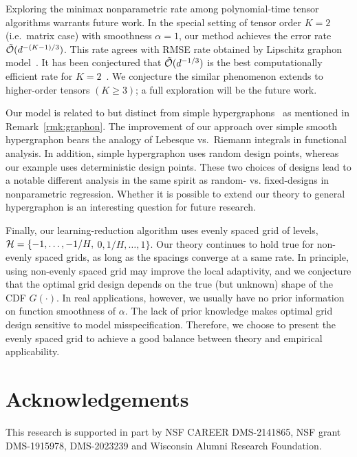 \documentclass[twoside,11pt]{article}
\theoremstyle{definition}
\begin{document}
Exploring the minimax nonparametric rate among polynomial-time tensor algorithms warrants future work. In the special setting of tensor order $K = 2$ (i.e.\ matrix case) with smoothness $\alpha=1$, our method achieves the error rate $\tilde{\mathcal{O}}(d^{-(K-1)/3})$. This rate agrees with RMSE rate obtained by Lipschitz graphon model~\citep{xu2018rates}. It has been conjectured that $\tilde {\mathcal{O}}(d^{-1/3})$ is the best computationally efficient rate for $K=2$~\citep{xu2018rates,zhang2018network}. We conjecture the similar phenomenon extends to higher-order tensors $(K\geq 3)$; a full exploration will be the future work. 

Our model is related to but distinct from simple hypergraphons~\citep{balasubramanian2021nonparametric} as mentioned in Remark~\ref{rmk:graphon}. 
The improvement of our approach over simple smooth hypergraphon bears the analogy of Lebesque vs.\ Riemann integrals in functional analysis. In addition, simple hypergraphon uses random design points, whereas our example uses deterministic design points. These two choices of designs lead to a notable different analysis in the same spirit as random- vs. fixed-designs in nonparametric regression. Whether it is possible to extend our theory to general hypergraphon is an interesting question for future research.

Finally, our learning-reduction algorithm uses evenly spaced grid of levels, $\mathcal{H}=\{-1,\ldots,-1/H,$ $0, 1/H,\ldots,1\}$. Our theory continues to hold true for non-evenly spaced grids, as long as the spacings converge at a same rate. In principle, using non-evenly spaced grid may improve the local adaptivity, and we conjecture that the optimal grid design depends on the true (but unknown) shape of the CDF $G(\cdot)$. In real applications, however, we usually have no prior information on function smoothness of $\alpha$. The lack of prior knowledge makes optimal grid design sensitive to model misspecification. Therefore, we choose to present the evenly spaced grid to achieve a good balance between theory and empirical applicability. 

\section*{Acknowledgements}
This research is supported in part by NSF CAREER DMS-2141865, NSF grant DMS-1915978, DMS-2023239 and Wisconsin Alumni Research Foundation.







\end{document}

